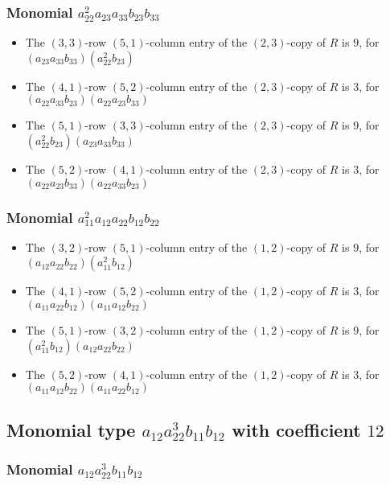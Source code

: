\documentclass{article}
\begin{document}
\subsubsection{Monomial $ a_{22}^{2} a_{23} a_{33} b_{23} b_{33} $}

\begin{itemize}
\item The $(3, 3)$-row $(5, 1)$-column entry of the $ \left(2, 3\right) $-copy of $R$ is $ 9 $, for $( a_{23} a_{33} b_{33} )( a_{22}^{2} b_{23} )$ 
\item The $(4, 1)$-row $(5, 2)$-column entry of the $ \left(2, 3\right) $-copy of $R$ is $ 3 $, for $( a_{22} a_{33} b_{23} )( a_{22} a_{23} b_{33} )$ 
\item The $(5, 1)$-row $(3, 3)$-column entry of the $ \left(2, 3\right) $-copy of $R$ is $ 9 $, for $( a_{22}^{2} b_{23} )( a_{23} a_{33} b_{33} )$ 
\item The $(5, 2)$-row $(4, 1)$-column entry of the $ \left(2, 3\right) $-copy of $R$ is $ 3 $, for $( a_{22} a_{23} b_{33} )( a_{22} a_{33} b_{23} )$ 
\end{itemize}
\subsubsection{Monomial $ a_{11}^{2} a_{12} a_{22} b_{12} b_{22} $}

\begin{itemize}
\item The $(3, 2)$-row $(5, 1)$-column entry of the $ \left(1, 2\right) $-copy of $R$ is $ 9 $, for $( a_{12} a_{22} b_{22} )( a_{11}^{2} b_{12} )$ 
\item The $(4, 1)$-row $(5, 2)$-column entry of the $ \left(1, 2\right) $-copy of $R$ is $ 3 $, for $( a_{11} a_{22} b_{12} )( a_{11} a_{12} b_{22} )$ 
\item The $(5, 1)$-row $(3, 2)$-column entry of the $ \left(1, 2\right) $-copy of $R$ is $ 9 $, for $( a_{11}^{2} b_{12} )( a_{12} a_{22} b_{22} )$ 
\item The $(5, 2)$-row $(4, 1)$-column entry of the $ \left(1, 2\right) $-copy of $R$ is $ 3 $, for $( a_{11} a_{12} b_{22} )( a_{11} a_{22} b_{12} )$ 
\end{itemize}
\subsection{Monomial type $ a_{12} a_{22}^{3} b_{11} b_{12} $ with coefficient $ 12 $}

\subsubsection{Monomial $ a_{12} a_{22}^{3} b_{11} b_{12} $}
\end{document}
